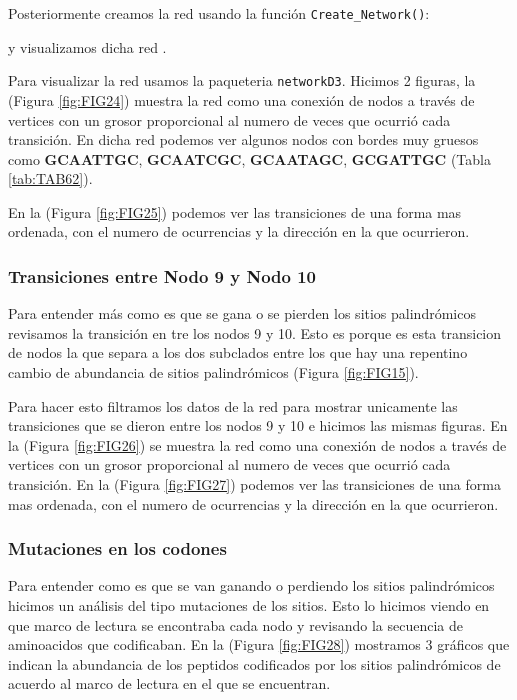 \documentclass[
]{book}
\begin{document}
Posteriormente creamos la red usando la función \texttt{Create\_Network()}:

y visualizamos dicha red .

Para visualizar la red usamos la paqueteria \texttt{networkD3}. Hicimos 2 figuras, la (Figura \ref{fig:FIG24}) muestra la red como una conexión de nodos a través de vertices con un grosor proporcional al numero de veces que ocurrió cada transición. En dicha red podemos ver algunos nodos con bordes muy gruesos como \textbf{GCAATTGC}, \textbf{GCAATCGC}, \textbf{GCAATAGC}, \textbf{GCGATTGC} (Tabla \ref{tab:TAB62}).

En la (Figura \ref{fig:FIG25}) podemos ver las transiciones de una forma mas ordenada, con el numero de ocurrencias y la dirección en la que ocurrieron.

\hypertarget{transiciones-entre-nodo-9-y-nodo-10-1}{%
\subsubsection{Transiciones entre Nodo 9 y Nodo 10}\label{transiciones-entre-nodo-9-y-nodo-10-1}}

Para entender más como es que se gana o se pierden los sitios palindrómicos revisamos la transición en tre los nodos 9 y 10. Esto es porque es esta transicion de nodos la que separa a los dos subclados entre los que hay una repentino cambio de abundancia de sitios palindrómicos (Figura \ref{fig:FIG15}).

Para hacer esto filtramos los datos de la red para mostrar unicamente las transiciones que se dieron entre los nodos 9 y 10 e hicimos las mismas figuras.
En la (Figura \ref{fig:FIG26}) se muestra la red como una conexión de nodos a través de vertices con un grosor proporcional al numero de veces que ocurrió cada transición. En la (Figura \ref{fig:FIG27}) podemos ver las transiciones de una forma mas ordenada, con el numero de ocurrencias y la dirección en la que ocurrieron.

\hypertarget{mutaciones-en-los-codones-1}{%
\subsubsection{Mutaciones en los codones}\label{mutaciones-en-los-codones-1}}

Para entender como es que se van ganando o perdiendo los sitios palindrómicos hicimos un análisis del tipo mutaciones de los sitios. Esto lo hicimos viendo en que marco de lectura se encontraba cada nodo y revisando la secuencia de aminoacidos que codificaban. En la (Figura \ref{fig:FIG28}) mostramos 3 gráficos que indican la abundancia de los peptidos codificados por los sitios palindrómicos de acuerdo al marco de lectura en el que se encuentran.
\end{document}
